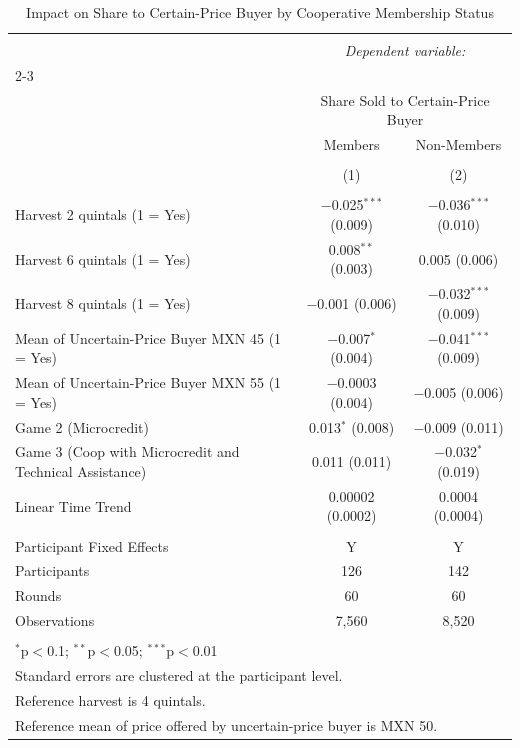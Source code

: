 
\begin{table}[!htbp] \centering 
  \caption{Impact on Share to Certain-Price Buyer by Cooperative Membership Status} 
  \label{round_level_outcomes_coop} 
\begin{tabular}{@{\extracolsep{5pt}}lcc} 
\\[-1.8ex]\hline 
\hline \\[-1.8ex] 
 & \multicolumn{2}{c}{\textit{Dependent variable:}} \\ 
\cline{2-3} 
\\[-1.8ex] & \multicolumn{2}{c}{Share Sold to Certain-Price Buyer} \\ 
 & Members & Non-Members \\ 
\\[-1.8ex] & (1) & (2)\\ 
\hline \\[-1.8ex] 
 Harvest 2 quintals (1 = Yes) & $-$0.025$^{***}$ (0.009) & $-$0.036$^{***}$ (0.010) \\ 
  Harvest 6 quintals (1 = Yes) & 0.008$^{**}$ (0.003) & 0.005 (0.006) \\ 
  Harvest 8 quintals (1 = Yes) & $-$0.001 (0.006) & $-$0.032$^{***}$ (0.009) \\ 
  Mean of Uncertain-Price Buyer MXN 45 (1 = Yes) & $-$0.007$^{*}$ (0.004) & $-$0.041$^{***}$ (0.009) \\ 
  Mean of Uncertain-Price Buyer MXN 55 (1 = Yes) & $-$0.0003 (0.004) & $-$0.005 (0.006) \\ 
  Game 2 (Microcredit) & 0.013$^{*}$ (0.008) & $-$0.009 (0.011) \\ 
  Game 3 (Coop with Microcredit and Technical Assistance) & 0.011 (0.011) & $-$0.032$^{*}$ (0.019) \\ 
  Linear Time Trend & 0.00002 (0.0002) & 0.0004 (0.0004) \\ 
 \hline \\[-1.8ex] 
Participant Fixed Effects & Y & Y \\ 
Participants & 126 & 142 \\ 
Rounds & 60 & 60 \\ 
Observations & 7,560 & 8,520 \\ 
\hline 
\hline \\[-1.8ex] 
\multicolumn{3}{l}{$^{*}$p$<$0.1; $^{**}$p$<$0.05; $^{***}$p$<$0.01} \\ 
\multicolumn{3}{l}{Standard errors are clustered at the participant level.} \\ 
\multicolumn{3}{l}{Reference harvest is 4 quintals.} \\ 
\multicolumn{3}{l}{Reference mean of price offered by uncertain-price buyer is MXN 50.} \\ 
\end{tabular} 
\end{table} 
